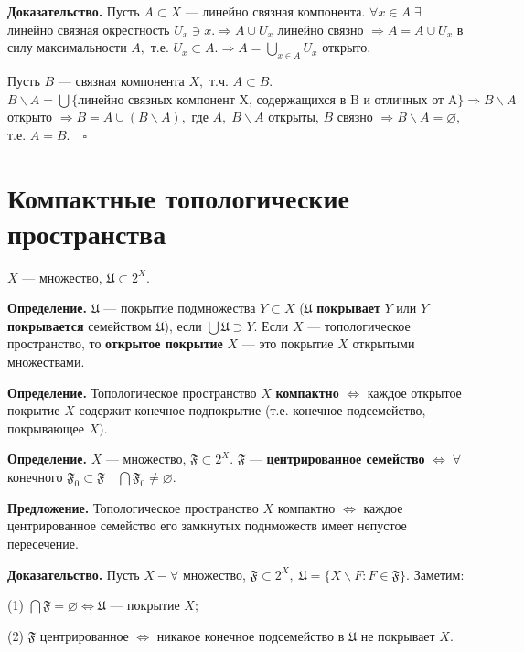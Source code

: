 \documentclass[12pt,a4paper]{article}
\begin{document}
\textbf{Доказательство.} Пусть $A \subset X$ --- линейно связная компонента. $\forall x \in A \; \exists$ линейно связная окрестность $U_{x} \ni x. \Rightarrow A \cup U_{x}$ линейно связно $\Rightarrow A = A \cup U_{x}$ в силу максимальности $A,$ т.е. $U_{x} \subset A. \Rightarrow A = \underset{x \in A}{\bigcup} U_{x}$ открыто.

Пусть $B$ --- связная компонента $X,$ т.ч. $A \subset B.$ $B \backslash A = \bigcup \{\text{линейно связных компонент X, содержащихся в B и отличных от A}\} \Rightarrow B \backslash A$ открыто $\Rightarrow B = A \cup (B \backslash A),$ где $A, \; B \backslash A$ открыты, $B$ связно $\Rightarrow B \backslash A = \varnothing,$ т.е. $A = B. \quad \square$ 

\section{Компактные топологические пространства}

$X$ --- множество, $\mathfrak{U} \subset 2^{X}.$ 

\textbf{Определение.} $\mathfrak{U}$ --- покрытие подмножества $Y \subset X$ ($\mathfrak{U}$ \textbf{покрывает} $Y$ или $Y$ \textbf{покрывается} семейством $\mathfrak{U}$), если $\bigcup \mathfrak{U} \supset Y.$ Если $X$ --- топологическое пространство, то \textbf{открытое покрытие} $X$ --- это покрытие $X$ открытыми множествами. 

\textbf{Определение.} Топологическое пространство $X$ \textbf{компактно} $\Leftrightarrow$ каждое открытое покрытие $X$ содержит конечное подпокрытие (т.е. конечное подсемейство, покрывающее $X).$

\textbf{Определение.} $X$ --- множество, $\mathfrak{F} \subset 2^{X}.$ $\mathfrak{F}$ --- \textbf{центрированное семейство} $\Leftrightarrow \; \forall$ конечного $\mathfrak{F}_{0} \subset \mathfrak{F} \quad \bigcap \mathfrak{F}_{0} \neq \varnothing.$

\textbf{Предложение.} Топологическое пространство $X$ компактно $\Leftrightarrow$ каждое центрированное семейство его замкнутых поднможеств имеет непустое пересечение. 

\textbf{Доказательство.} Пусть $X - \forall$ множество, $\mathfrak{F} \subset 2^{X}, \; \mathfrak{U} = \{X \backslash F\!: F \in \mathfrak{F}\}.$ Заметим: 

(1) $\bigcap \mathfrak{F} = \varnothing \Leftrightarrow \mathfrak{U}$ --- покрытие $X;$ 

(2) $\mathfrak{F}$ центрированное $\Leftrightarrow$ никакое конечное подсемейство в $\mathfrak{U}$ не покрывает $X.$ 
\end{document}
